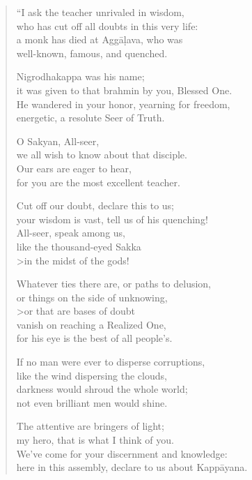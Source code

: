 \documentclass[12pt,openany]{book}%
\begin{document}
\begin{verse}%
“I ask the teacher unrivaled in wisdom, \\
who has cut off all doubts in this very life: \\
a monk has died at \textsanskrit{Aggāḷava}, who was \\
well-known, famous, and quenched. 

Nigrodhakappa was his name; \\
it was given to that brahmin by you, Blessed One. \\
He wandered in your honor, yearning for freedom, \\
energetic, a resolute Seer of Truth. 

O Sakyan, All-seer, \\
we all wish to know about that disciple. \\
Our ears are eager to hear, \\
for you are the most excellent teacher. 

Cut off our doubt, declare this to us; \\
your wisdom is vast, tell us of his quenching! \\
All-seer, speak among us, \\
like the thousand-eyed Sakka \\>in the midst of the gods! 

Whatever ties there are, or paths to delusion, \\
or things on the side of unknowing, \\>or that are bases of doubt \\
vanish on reaching a Realized One, \\
for his eye is the best of all people’s. 

If no man were ever to disperse corruptions, \\
like the wind dispersing the clouds, \\
darkness would shroud the whole world; \\
not even brilliant men would shine. 

The attentive are bringers of light; \\
my hero, that is what I think of you. \\
We’ve come for your discernment and knowledge: \\
here in this assembly, declare to us about \textsanskrit{Kappāyana}. 


\end{verse}
\end{document}
